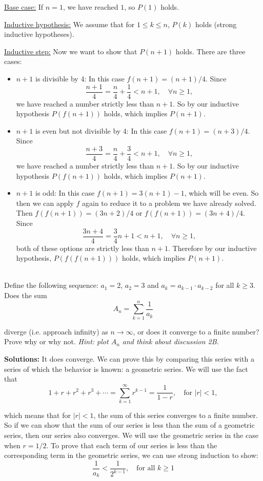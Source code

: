 \documentclass[11pt]{article}
\newif\ifsolutions
\renewcommand{\answer}[1]{{\color{mydarkblue}\textbf{Solutions: }#1}}
\begin{document}
\begin{qunlist}
{\underline{Base case:} If $n=1$, we have reached $1$, so $P(1)$ holds.

\underline{Inductive hypothesis:} We assume that for $1 \leq k \leq n$, 
$P(k)$ holds (strong inductive hypotheses).

\underline{Inductive step:} Now we want to show that $P(n+1)$ holds. There are three cases:
\begin{itemize}
\item $n+1$ is divisible by 4: In this case $f(n+1) = (n+1)/4$. 
Since 
\[ \frac{n+1}{4} = \frac{n}{4} + \frac{1}{4} < n+1, \quad \forall n \geq 1, \]
we have reached a number strictly less than $n+1$. So by our inductive hypothesis $P(f(n+1))$ holds, which implies $P(n+1)$.
\item $n+1$ is even but not divisible by 4: In this case $f(n+1) = (n+3)/4$. 
Since 
\[ \frac{n+3}{4} = \frac{n}{4} + \frac{3}{4} < n+1, \quad \forall n \geq 1, \]
we have reached a number strictly less than $n+1$. So by our inductive hypothesis $P(f(n+1))$ holds, which implies $P(n+1)$.
\item $n+1$ is odd: In this case $f(n+1) = 3(n+1) - 1$, which will be even.  
So then we can apply $f$ again to reduce it to a problem we have already solved.  
Then $f(f(n+1)) = (3n+2)/4$ or $f(f(n+1)) = (3n+4)/4$. Since
\[ \frac{3n+4}{4} = \frac{3}{4} n + 1 < n+1, \quad \forall n\geq 1, \]
both of these options are strictly less than $n+1$. 
Therefore by our inductive hypothesis, $P(f(f(n+1)))$ holds, which implies $P(n+1)$.
\end{itemize}
}
\fi

\pagebreak

 \\
Define the following sequence: $a_1 =2$, $a_2 = 3$ and $a_k = a_{k-1} \cdot a_{k-2}$ for all $k \geq 3$. \\ 
Does the sum 
\[ A_n = \sum_{k=1}^n \frac{1}{a_k} \]

diverge (i.e. approach infinity) as $n \to \infty$, or does it converge to a finite number?  
Prove why or why not.
{\em Hint: plot $A_n$ and think about discussion 2B.}

\ifsolutions
\answer{
It does converge. We can prove this by comparing this series with a series of which the behavior is known: 
a geometric series. We will use the fact that
\[ 1 + r + r^2 + r^3 + \cdots = \sum_{k=1}^{\infty} r^{k-1} = \frac{1}{1-r}, \quad \text{for } |r| < 1, \]

which means that for $|r| < 1$, the sum of this series converges to a finite number. 
So if we can show that the sum of our series is less than the sum of a geometric series, 
then our series also converges. We will use the geometric series in the case when $r = 1/2$.
To prove that each term of our series is less than the corresponding term in the geometric series, 
we can use strong induction to show:
\[ \frac{1}{a_k} < \frac{1}{2^{k-1}}, \quad \text{for all } k \geq 1 \]

}
\end{qunlist}
\end{document}
